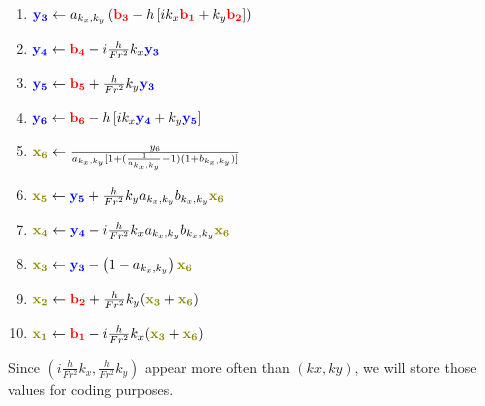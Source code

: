 \documentclass[10pt]{article}
\newcommand{\mbfb}[1]{{\color{blue}\mathbf{#1}}}
\newcommand{\mbfr}[1]{{\color{red}\mathbf{#1}}}
\newcommand{\mbfg}[1]{{\color{olive}\mathbf{#1}}}
\begin{document}
\begin{enumerate}
	\item $\mbfb{y_3}\gets a_{k_x, k_y} \left(\mbfr{b_3} -h \left[i k_x \mbfr{b_1} + k_y \mbfr{b_2}\right]\right)$ 
	\item $\mbfb{y_4} \gets \mbfr{b_4} - i \frac{h}{Fr^2}k_x \mbfb{y_3}$
	\item $\mbfb{y_5} \gets \mbfr{b_5} + \frac{h}{Fr^2}k_y \mbfb{y_3}$
	\item $\mbfb{y_6} \gets \mbfr{b_6} -h \left[ik_x \mbfb{y_4} +k_y\mbfb{y_5}\right]$
	\item $\mbfg{x_6} \gets \frac{y_6}{a_{k_x, k_y}[1+(\frac{1}{a_{k_x, k_y}}-1)(1+b_{k_x, k_y})]}$
	\item $\mbfg{x_5} \gets \mbfb{y_5} +\frac{h}{Fr^2}k_y a_{k_x, k_y}b_{k_x,k_y}\mbfg{x_6}$
	\item $\mbfg{x_4} \gets \mbfb{y_4} - i \frac{h}{Fr^2}k_xa_{k_x, k_y}b_{k_x,k_y}\mbfg{x_6}$
	\item $\mbfg{x_3} \gets \mbfb{y_3} - \left(1-a_{k_x,k_y}\right)\mbfg{x_6}$
	\item $\mbfg{x_2}\gets \mbfr{b_2} + \frac{h}{Fr^2}k_y(\mbfg{x_3}+\mbfg{x_6})$
	\item $\mbfg{x_1} \gets \mbfr{b_1} - i \frac{h}{Fr^2}k_x(\mbfg{x_3}+\mbfg{x_6})$
\end{enumerate}
Since $(i \frac{h}{Fr^2} k_x, \frac{h}{Fr^2}k_y)$ appear more often than $(kx, ky)$, we will store those values for coding purposes. 
\end{document}
